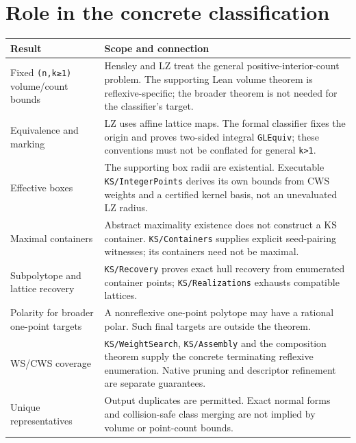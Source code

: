 \documentclass[11pt,a4paper,oneside]{report}
\begin{document}
\section{Role in the concrete
classification}\label{finiteness-and-box-reduction--role-in-the-concrete-classification}

\begin{longtable}[]{@{}
  >{\raggedright\arraybackslash}p{}
  >{\raggedright\arraybackslash}p{}@{}}
\toprule\noalign{}
\begin{minipage}[b]{\linewidth}\raggedright
Result
\end{minipage} & \begin{minipage}[b]{\linewidth}\raggedright
Scope and connection
\end{minipage} \\
\midrule\noalign{}
\endhead
\bottomrule\noalign{}
\endlastfoot
Fixed \texttt{(\allowbreak{}n,\allowbreak{}k≥1)}
volume/\allowbreak{}count bounds & Hensley and LZ treat the general
positive-interior-count problem. The supporting Lean volume theorem is
reflexive-specific; the broader theorem is not needed for the
classifier's target. \\
Equivalence and marking & LZ uses affine lattice maps. The formal
classifier fixes the origin and proves two-sided integral
\texttt{GLEquiv}; these conventions must not be conflated for general
\texttt{k>1}. \\
Effective boxes & The supporting box radii are existential. Executable
\texttt{KS/\allowbreak{}IntegerP\allowbreak{}oints} derives its own
bounds from CWS weights and a certified kernel basis, not an unevaluated
LZ radius. \\
Maximal containers & Abstract maximality existence does not construct a
KS container. \texttt{KS/\allowbreak{}Containe\allowbreak{}rs} supplies
explicit seed-pairing witnesses; its containers need not be maximal. \\
Subpolytope and lattice recovery & \texttt{KS/\allowbreak{}Recovery}
proves exact hull recovery from enumerated container points;
\texttt{KS/\allowbreak{}Realizat\allowbreak{}ions} exhausts compatible
lattices. \\
Polarity for broader one-point targets & A nonreflexive one-point
polytope may have a rational polar. Such final targets are outside the
theorem. \\
WS/\allowbreak{}CWS coverage &
\texttt{KS/\allowbreak{}WeightSe\allowbreak{}arch},
\texttt{KS/\allowbreak{}Assembly} and the composition theorem supply the
concrete terminating reflexive enumeration. Native pruning and
descriptor refinement are separate guarantees. \\
Unique representatives & Output duplicates are permitted. Exact normal
forms and collision-safe class merging are not implied by volume or
point-count bounds. \\
\end{longtable}
\end{document}
